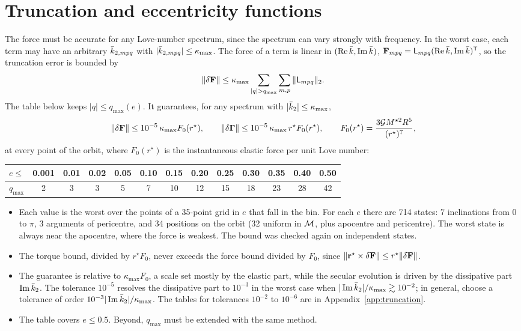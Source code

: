 \section{Truncation and eccentricity functions}\label{sec:truncation}
The force must be accurate for any Love-number spectrum, since the spectrum can vary strongly with frequency. In the worst case, each term may have an arbitrary $\bar k_{2,mpq}$ with $|\bar k_{2,mpq}|\le\kappa_{\max}$. The force of a term is linear in $(\operatorname{Re}\bar k,\operatorname{Im}\bar k)$, $\mathbf F_{mpq}=\mathsf L_{mpq}(\operatorname{Re}\bar k,\operatorname{Im}\bar k)^{\mathsf T}$, so the truncation error is bounded by
\[
  \|\delta\vF\|\le\kappa_{\max}\sum_{|q|>q_{\max}}\sum_{m,p}\|\mathsf L_{mpq}\|_2.
\]
The table below keeps $|q|\le q_{\max}(e)$. It guarantees, for any spectrum with $|\bar k_2|\le\kappa_{\max}$,
\begin{equation}
  \|\delta\mathbf F\|\le10^{-5}\,\kappa_{\max}F_0(r^\star),\qquad \|\delta\boldsymbol\Gamma\|\le10^{-5}\,\kappa_{\max}\,r^\star F_0(r^\star),\qquad F_0(r^\star)=\frac{3\mathcal{G} M^{\star2}R^5}{(r^\star)^7}, \label{eq:guarantee}
\end{equation}
at every point of the orbit, where $F_0(r^\star)$ is the instantaneous elastic force per unit Love number:
\begin{center}
\renewcommand{\arraystretch}{1.2}\setlength{\tabcolsep}{4pt}\small
\begin{tabular}{l|cccccccccccc}\toprule
$e\le$ & 0.001 & 0.01 & 0.02 & 0.05 & 0.10 & 0.15 & 0.20 & 0.25 & 0.30 & 0.35 & 0.40 & 0.50\\\midrule
$q_{\max}$ & 2 & 3 & 3 & 5 & 7 & 10 & 12 & 15 & 18 & 23 & 28 & 42\\\bottomrule
\end{tabular}
\end{center}
\begin{itemize}
  \item Each value is the worst over the points of a 35-point grid in $e$ that fall in the bin. For each $e$ there are 714 states: 7 inclinations from 0 to $\pi$, 3 arguments of pericentre, and 34 positions on the orbit (32 uniform in $\mathcal{M}$, plus apocentre and pericentre). The worst state is always near the apocentre, where the force is weakest. The bound was checked again on independent states.
  \item The torque bound, divided by $r^\star F_0$, never exceeds the force bound divided by $F_0$, since $\|\mathbf r^\star\times\delta\mathbf F\|\le r^\star\|\delta\mathbf F\|$.
  \item The guarantee is relative to $\kappa_{\max}F_0$, a scale set mostly by the elastic part, while the secular evolution is driven by the dissipative part $\operatorname{Im}\bar k_2$. The tolerance $10^{-5}$ resolves the dissipative part to $10^{-3}$ in the worst case when $|\operatorname{Im}\bar k_2|/\kappa_{\max}\gtrsim10^{-2}$; in general, choose a tolerance of order $10^{-3}|\operatorname{Im}\bar k_2|/\kappa_{\max}$. The tables for tolerances $10^{-2}$ to $10^{-6}$ are in Appendix~\ref{app:truncation}.
  \item The table covers $e\le0.5$. Beyond, $q_{\max}$ must be extended with the same method.
\end{itemize}

